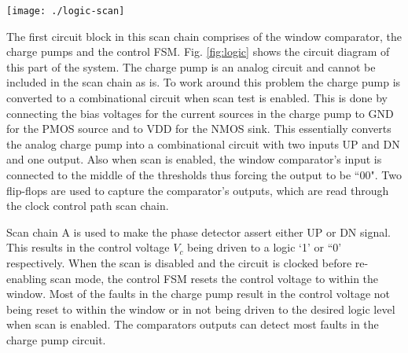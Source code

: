 \documentclass[conference]{IEEEtran}
\begin{document}
\begin{figure*}[h]
\centering
\texttt{[image: ./logic-scan]}
\caption{Control logic for generating $\overline{UP}/DN$
and $Enable$ signals for the ring counter and 
$UP_{st}$ \& $DN_{st}$ signals
for the strong charge pump. $V_H$, $V_L$ are the
upper and lower thresholds of window comparator respectively. All
flip-flops are clocked with the divided clock of the coarse control
loop.}
\label{fig:logic}
\end{figure*}

The first
circuit block in this scan chain comprises of the window comparator, the
charge pumps and the control FSM. Fig. \ref{fig:logic} shows the
circuit diagram of this part of the system. The charge pump
is an analog circuit and cannot be included in the scan chain 
as is. To work around this problem the charge pump
is converted to a combinational circuit when scan test is enabled.
This is done by connecting 
the bias voltages for the current sources in the charge pump
to GND for the PMOS source and to VDD for the NMOS sink. 
This
essentially converts the analog charge pump into a combinational
circuit with two inputs UP and DN and one output. Also when scan is
enabled, the window comparator's input is connected to the middle of
the thresholds thus forcing the output to be ``00". 
Two flip-flops are used to capture the comparator's outputs, which
are read through the clock control path scan chain.

Scan chain A is used to make the phase detector assert either UP
or DN signal. This results in the control voltage $V_c$ being driven
to a logic `1' or ``0' respectively. When the scan is disabled and 
the circuit is clocked before re-enabling scan mode, the control FSM
resets the control voltage to within the window. Most of the
faults in the charge pump result in the control voltage not 
being reset to within the window or in not being driven to 
the desired logic level when scan is enabled. 
The comparators outputs can detect most faults in the charge pump circuit.
\end{document}
